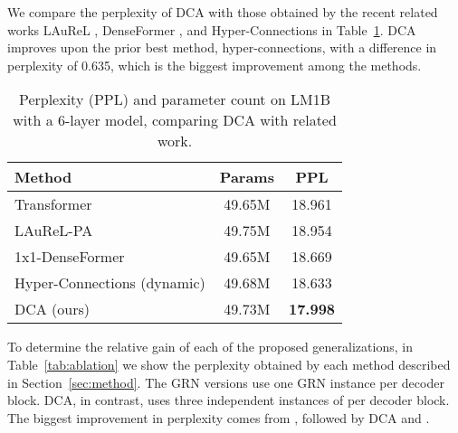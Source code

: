 We compare the perplexity of DCA with those obtained by the recent related works LAuReL \citep{menghani2024laurel}, DenseFormer \citep{pagliardini2024denseformer}, and Hyper-Connections \citep{zhu2024hyper} in Table~\ref{tab:comparison}. DCA improves upon the prior best method, hyper-connections, with a difference in perplexity of 0.635, which is the biggest improvement among the methods.

\begin{table}[h]
    \vskip -0.1in
    \caption{Perplexity (PPL) and parameter count on LM1B with a 6-layer model, comparing DCA with related work.}
    \label{tab:comparison}
    \vskip 0.15in
    \begin{center}
    \begin{small}
    \begin{sc}
    \begin{tabular}{l|cc}
        \toprule
        Method & Params & PPL \\
        \midrule
        Transformer & 49.65M & 18.961 \\
        LAuReL-PA & 49.75M & 18.954 \\
        1x1-DenseFormer & 49.65M & 18.669 \\
        Hyper-Connections (dynamic) & 49.68M & 18.633 \\
        \midrule
        DCA (ours) & 49.73M & \textbf{17.998} \\
        \bottomrule
    \end{tabular}
    \end{sc}
    \end{small}
    \end{center}
    \vskip -0.1in
\end{table}


To determine the relative gain of each of the proposed generalizations, in Table~\ref{tab:ablation} we show the perplexity obtained by each method described in Section~\ref{sec:method}. The GRN versions use one GRN instance per decoder block. DCA, in contrast, uses three independent instances of \GenC{} per decoder block. The biggest improvement in perplexity comes from \GenA{}, followed by DCA and \GenB{}.

